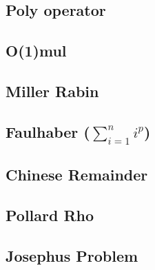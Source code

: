 \documentclass[a4paper,10pt,twocolumn,oneside]{article}
\begin{document}
\subsection{Poly operator}


\subsection{O(1)mul}


% 

%


\subsection{Miller Rabin}


% 

\subsection{Faulhaber ($\sum\limits_{i=1}^{n}i^p$)}


\subsection{Chinese Remainder}


\subsection{Pollard Rho}


\subsection{Josephus Problem}

\end{document}
